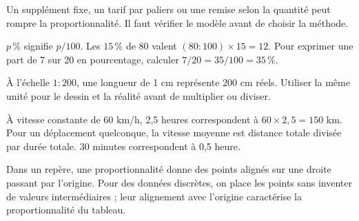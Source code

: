 \begin{attention}Un supplément fixe, un tarif par paliers ou une remise selon la quantité peut rompre la proportionnalité. Il faut vérifier le modèle avant de choisir la méthode.\end{attention}
\clearpage
{}\label{cours-11-2}
\begin{definition}$p\,\%$ signifie $p/100$. Les $15\,\%$ de 80 valent $(80:100)\times15=12$. Pour exprimer une part de 7 sur 20 en pourcentage, calculer $7/20=35/100=35\,\%$.\end{definition}
\begin{savoirfaire}[Échelles]À l’échelle $1:200$, une longueur de 1 cm représente 200 cm réels. Utiliser la même unité pour le dessin et la réalité avant de multiplier ou diviser.\end{savoirfaire}
\begin{exemple}À vitesse constante de 60 km/h, 2,5 heures correspondent à $60\times2{,}5=150$ km. Pour un déplacement quelconque, la vitesse moyenne est distance totale divisée par durée totale. 30 minutes correspondent à 0,5 heure.\end{exemple}
\begin{propriete}Dans un repère, une proportionnalité donne des points alignés sur une droite passant par l’origine. Pour des données discrètes, on place les points sans inventer de valeurs intermédiaires ; leur alignement avec l’origine caractérise la proportionnalité du tableau.\end{propriete}

